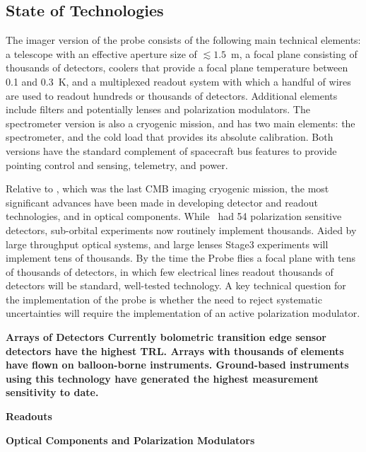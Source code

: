 
\subsection{State of Technologies}
\label{sec:technologies}

\vspace{-0.05in}

The imager version of the probe consists of the following main technical elements: a telescope with an effective aperture size 
of $\lesssim1.5$~m, a focal plane consisting of thousands of detectors, coolers that provide a focal plane temperature between 0.1 and 0.3~K, 
and a multiplexed readout system with which a handful of wires are used to readout hundreds or thousands of detectors. Additional 
elements include filters and potentially lenses and polarization modulators. 
The spectrometer version is also a cryogenic mission, and has two main elements: the spectrometer, and the cold load that provides its
absolute calibration. Both versions have the standard complement of spacecraft bus features to provide pointing control 
and sensing, telemetry, and power. 

Relative to \planck , which was the last CMB imaging cryogenic mission, the most significant advances have been made in 
developing detector and readout technologies, and in optical components. While \planck\ had 54 polarization 
sensitive detectors, sub-orbital experiments now routinely implement thousands. Aided by large throughput optical 
systems, and large lenses Stage3 experiments will implement
tens of thousands. By the time the Probe flies a focal plane with tens of thousands 
of detectors, in which few electrical lines readout thousands of detectors will be standard, well-tested technology. 
A key technical question for the implementation of the probe is whether the need to reject systematic uncertainties 
will require the implementation of an active polarization modulator. 

\bf{Arrays of Detectors} \hspace{0.1in} Currently bolometric transition edge sensor detectors have the highest TRL. Arrays
with thousands of elements have flown on balloon-borne instruments. Ground-based instruments using this 
technology have generated the highest measurement sensitivity to date. 



\bf{Readouts}

\bf{Optical Components and Polarization Modulators}



